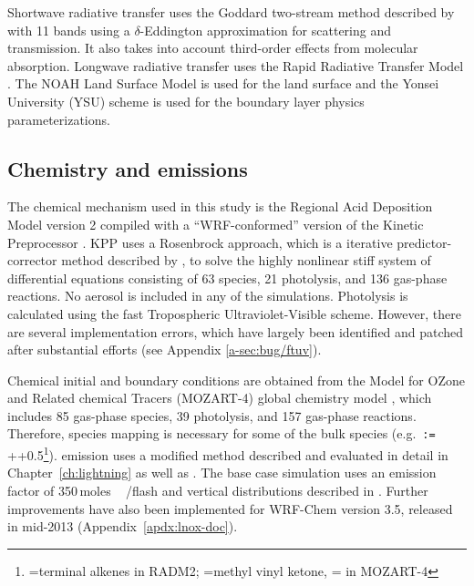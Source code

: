 	Shortwave radiative transfer uses the Goddard two-stream method described by \citet{Chou:1998kx} with 11 bands using
	a $\delta$-Eddington approximation for scattering and transmission. It also takes into account third-order effects from
	molecular absorption. Longwave radiative transfer uses the Rapid Radiative Transfer Model \citep[RRTM;][]{Mlawer:1997vn}.
	The NOAH Land Surface Model \citep{Chen:2001ys} is used for the land surface and the Yonsei University (YSU) scheme
	\citep{Hong:2006fk} is used for the boundary layer physics parameterizations.

\subsection{Chemistry and emissions}\label{ssec:2006/method/chem}

	The chemical mechanism used in this study is the Regional Acid Deposition Model version 2 \citep[RADM2;][]{Stockwell:1990ez} compiled with a ``WRF-conformed'' version of the Kinetic Preprocessor \citep[KPP;][]{Sandu:2006jl}. KPP uses a Rosenbrock approach, which is a iterative predictor-corrector method described by \citet{Hairer:1993zr}, to solve the highly nonlinear stiff system of differential equations consisting of 63 species, 21 photolysis, and 136 gas-phase reactions. No aerosol is included in any of the simulations. Photolysis is calculated using the fast Tropospheric Ultraviolet-Visible \citep[FTUV;][]{Tie:2003ve} scheme. However, there are several implementation errors, which have largely been identified and patched after substantial efforts (see Appendix \ref{a-sec:bug/ftuv}).

	Chemical initial and boundary conditions are obtained from the Model for OZone and Related chemical Tracers (MOZART-4) global chemistry model \citep{Emmons:2010fk}, which includes 85 gas-phase species, 39 photolysis, and 157 gas-phase reactions. Therefore, species mapping is necessary for some of the bulk species (e.g. \,\texttt{:=}\,++0.5\footnote{=terminal alkenes in RADM2; =methyl vinyl ketone, = in MOZART-4}). {\lnox} emission uses a modified \citet{Price:1992wb} method described and evaluated in detail in Chapter~\ref{ch:lightning} as well as \citet{Wong:2013vn}. The base case simulation uses an emission factor of 350\,\unit{moles\,/flash} and vertical distributions described in \citet{Ott:2010lo}. Further improvements have also been implemented for WRF-Chem version 3.5, released in mid-2013 (Appendix~\ref{apdx:lnox-doc}).
	
